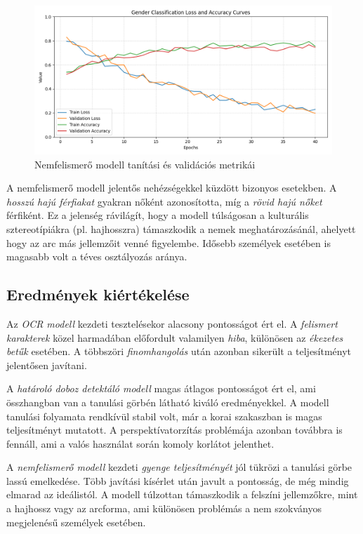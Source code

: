\documentclass[
]{thesis-ekf}
\theoremstyle{definition}
\theoremstyle{remark}
\begin{document}
\begin{figure} \centering \includegraphics[width=\textwidth]{gender_learning_curves} \caption{Nemfelismerő modell tanítási és validációs metrikái} \label{fig-gender-training} \end{figure}

A nemfelismerő modell jelentős nehézségekkel küzdött bizonyos esetekben. A \emph{hosszú hajú férfiakat} gyakran nőként azonosította, míg a \emph{rövid hajú nőket} férfiként. Ez a jelenség rávilágít, hogy a modell túlságosan a kulturális sztereotípiákra (pl. hajhosszra) támaszkodik a nemek meghatározásánál, ahelyett hogy az arc más jellemzőit venné figyelembe. Idősebb személyek esetében is magasabb volt a téves osztályozás aránya.

\subsection{Eredmények kiértékelése} Az \emph{OCR modell} kezdeti tesztelésekor alacsony pontosságot ért el. A \emph{felismert karakterek} közel harmadában előfordult valamilyen \emph{hiba}, különösen az \emph{ékezetes betűk} esetében. A többszöri \emph{finomhangolás} után azonban sikerült a teljesítményt jelentősen javítani.

A \emph{határoló doboz detektáló modell} magas átlagos pontosságot ért el, ami összhangban van a tanulási görbén látható kiváló eredményekkel. A modell tanulási folyamata rendkívül stabil volt, már a korai szakaszban is magas teljesítményt mutatott. A perspektívatorzítás problémája azonban továbbra is fennáll, ami a valós használat során komoly korlátot jelenthet.

A \emph{nemfelismerő modell} kezdeti \emph{gyenge teljesítményét} jól tükrözi a tanulási görbe lassú emelkedése. Több javítási kísérlet után javult a pontosság, de még mindig elmarad az ideálistól. A modell túlzottan támaszkodik a felszíni jellemzőkre, mint a hajhossz vagy az arcforma, ami különösen problémás a nem szokványos megjelenésű személyek esetében.
\end{document}
